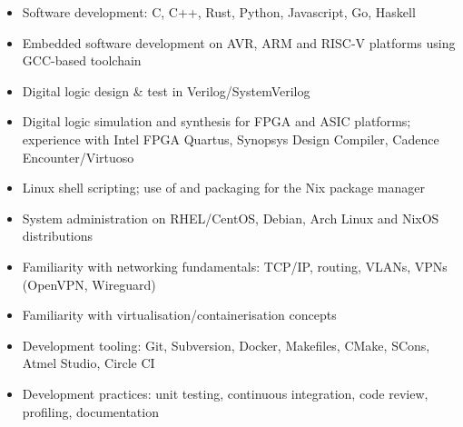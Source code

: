 
\begin{itemize}
  \item Software development: C, C++, Rust, Python, Javascript, Go, Haskell
  \item Embedded software development on AVR, ARM and RISC-V platforms using GCC-based toolchain
  \item Digital logic design \& test in Verilog/SystemVerilog
  \item Digital logic simulation and synthesis for FPGA and ASIC platforms; experience with Intel FPGA Quartus, Synopsys Design Compiler, Cadence Encounter/Virtuoso
  \item Linux shell scripting; use of and packaging for the Nix package manager
  \item System administration on RHEL/CentOS, Debian, Arch Linux and NixOS distributions
  \item Familiarity with networking fundamentals: TCP/IP, routing, VLANs, VPNs (OpenVPN, Wireguard)
  \item Familiarity with virtualisation/containerisation concepts
  \item Development tooling: Git, Subversion, Docker, Makefiles, CMake, SCons, Atmel Studio, Circle CI
  \item Development practices: unit testing, continuous integration, code review, profiling, documentation
\end{itemize}
